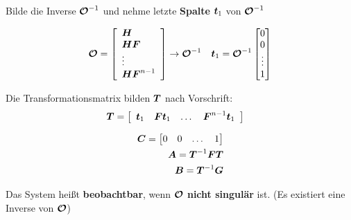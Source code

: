 \begin{tcolorbox}[colback=white!10!white,colframe=blue!70!black,title=KOCHREZEPT: Beobachtungsnormalform]
	
	\tcblower
	Bilde die Inverse $\boldsymbol{\mathcal{O}}^{-1}$ und nehme letzte \textbf{Spalte} $\boldsymbol{t}_1$ von $\boldsymbol{\mathcal{O}}^{-1}$
		
		\begin{align*}
		\boldsymbol{\mathcal{O}} &= 
		\left[\begin{array}{l}
		\boldsymbol{H}\\
		\boldsymbol{HF}\\
		\vdots\\
		\boldsymbol{HF}^{n-1}
		\end{array}\right] \rightarrow \boldsymbol{\mathcal{O}}^{-1} & 	 \boldsymbol{t}_1 = \boldsymbol{\mathcal{O}}^{-1} 	\begin{bmatrix}
		0 \\ 0 \\ \vdots \\ 1
		\end{bmatrix}
		\end{align*}

	Die Transformationsmatrix bilden $\boldsymbol{T}$ nach Vorschrift:
	\begin{align*}
	\boldsymbol{T} &= \left[\begin{array}{llll}
	\boldsymbol{t}_1 & \boldsymbol{Ft}_1 & \dots & \boldsymbol{F}^{n-1}\boldsymbol{t}_1
	\end{array}\right]
	\end{align*}
	
	\begin{tcolorbox}[colback=white!10!white,colframe=blue!70!black,title=Umrechnungsvorschrift in Beobachtungsnormalform]
		\begin{align*}
		\boldsymbol{C} = \begin{bmatrix}
		0 & 0& \dots &1
		\end{bmatrix} 
		\\
		 \boldsymbol{A} = \boldsymbol{T}^{-1}\boldsymbol{FT} 
		\\
	    	\boldsymbol{B} = \boldsymbol{T}^{-1}\boldsymbol{G}
		\end{align*}
	\end{tcolorbox}
	
	\begin{tcolorbox}[colback=white!10!white,colframe=gray!70!black,title=Beobachtbarkeit]
		Das System heißt \textbf{beobachtbar}, wenn $\boldsymbol{\mathcal{O}}$ \textbf{nicht singulär} ist. (Es existiert eine Inverse von $\boldsymbol{\mathcal{O}}$)
	\end{tcolorbox}
\end{tcolorbox}